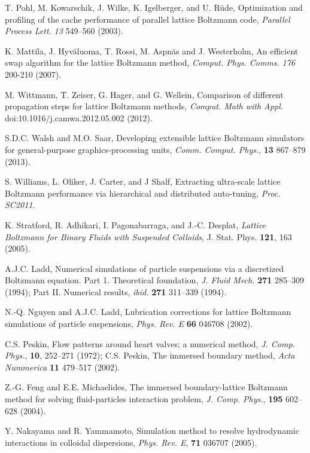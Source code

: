 \begin{thebibliography}{1}
T. Pohl, M. Kowarschik, J. Wilke, K. Igelberger, and U. R\"ude,
Optimization and profiling of the cache performance of parallel
lattice Boltzmann code,
\textit{Parallel Process Lett.} \textit{13} 549--560 (2003).

K. Mattila, J. Hyv\"aluoma, T. Rossi, M. Aspn\"as and J. Westerholm,
An efficient swap algorithm for the lattice Boltzmann method,
\textit{Comput. Phys. Comms.} \textit{176} 200-210 (2007).

M. Wittmann, T. Zeiser, G. Hager, and G. Wellein,
Comparison of different propagation steps for lattice Boltzmann methods,
\textit{Comput. Math with Appl.} doi:10.1016/j.camwa.2012.05.002 (2012).

S.D.C. Walsh and M.O. Saar,
Developing extensible lattice Boltzmann simulators for general-purpose
graphics-processing units,
\textit{Comm. Comput. Phys.}, \textbf{13} 867--879 (2013).


S. Williams, L. Oliker, J. Carter, and J Shalf,
Extracting ultra-scale lattice Boltzmann performance via
hierarchical and distributed auto-tuning,
\textit{Proc. SC2011}.


K. Stratford, R. Adhikari, I. Pagonabarraga, and J.-C. Desplat,
\textit{Lattice Boltzmann for Binary Fluids with Suspended Colloids},
J. Stat. Phys. \textbf{121}, 163 (2005).

A.J.C. Ladd,
Numerical simulations of particle suspensions via a discretized
Boltzmann equation. Part 1. Theoretical foundation,
\textit{J. Fluid Mech.} \textbf{271} 285--309 (1994);
Part II. Numerical results,
\textit{ibid.} \textbf{271} 311--339 (1994).
 

N.-Q. Nguyen and A.J.C. Ladd,
Lubrication corrections for lattice Boltzmann simulations of particle
suspensions,
\textit{Phys. Rev. E} \textbf{66} 046708 (2002).

C.S. Peskin,
Flow patterns around heart valves; a numerical method,
\textit{J. Comp. Phys.}, \textbf{10}, 252--271 (1972);
C.S. Peskin,
The immersed boundary method,
\textit{Acta Nummerica} \textbf{11} 479--517 (2002).

Z.-G. Feng and E.E. Michaelides,
The immersed boundary-lattice Boltzmann method for solving
fluid-particles interaction problem,
\textit{J. Comp. Phys.}, \textbf{195} 602--628 (2004).

Y. Nakayama and R. Yammamoto,
Simulation method to resolve hydrodynamic interactions in colloidal
dispersions,
\textit{Phys. Rev. E}, \textbf{71} 036707 (2005).


\end{thebibliography}








